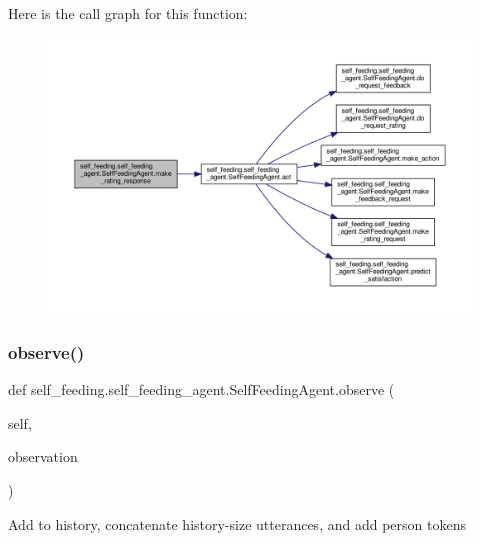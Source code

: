 Here is the call graph for this function\+:
\nopagebreak
\begin{figure}[H]
\begin{center}
\leavevmode
\includegraphics[width=350pt]{classself__feeding_1_1self__feeding__agent_1_1SelfFeedingAgent_a36a79f932c2ba47838596bc88c26625d_cgraph}
\end{center}
\end{figure}
\mbox{\label{classself__feeding_1_1self__feeding__agent_1_1SelfFeedingAgent_a7e76b6e8f11577a56a9c000cb360a44e}} 
\subsubsection{\texorpdfstring{observe()}{observe()}}
{\footnotesize\ttfamily def self\+\_\+feeding.\+self\+\_\+feeding\+\_\+agent.\+Self\+Feeding\+Agent.\+observe (\begin{DoxyParamCaption}\item[{}]{self,  }\item[{}]{observation }\end{DoxyParamCaption})}

\begin{DoxyVerb}Add to history, concatenate history-size utterances, and add person tokens\end{DoxyVerb}
 

